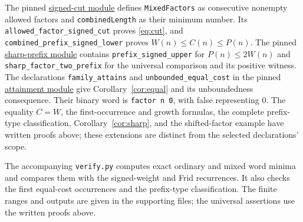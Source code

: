 \documentclass[11pt]{article}
\begin{document}
\begingroup\small
The pinned
\href{https://github.com/the-omega-institute/trureturing/blob/106c79bbb6571a3dc7c60f4b2146860d56e88fc5/D5/S1/Words/Palindromes/ThueMorseSignedCut.lean}{signed-cut module}
defines \texttt{MixedFactors} as consecutive nonempty allowed factors
and \texttt{combinedLength} as their minimum number.
Its \texttt{allowed\_factor\_signed\_cut} proves \eqref{eq:cut}, and
\texttt{combined\_prefix\_signed\_lower} proves $W(n)\leq C(n)\leq P(n)$.
The pinned
\href{https://github.com/the-omega-institute/trureturing/blob/106c79bbb6571a3dc7c60f4b2146860d56e88fc5/D5/S1/Words/Palindromes/ThueMorseSharpPrefix.lean}{sharp-prefix module}
contains \texttt{prefix\_signed\_upper} for $P(n)\leq2W(n)$ and
\texttt{sharp\_factor\_two\_prefix} for the universal comparison
and its positive witness.
The declarations \texttt{family\_attains} and
\texttt{unbounded\_equal\_cost} in
the pinned \href{https://github.com/the-omega-institute/trureturing/blob/106c79bbb6571a3dc7c60f4b2146860d56e88fc5/D5/S1/Words/Palindromes/ThueMorseAttainment.lean}{attainment module}
give Corollary~\ref{cor:equal} and its unboundedness consequence.
Their binary word is \texttt{factor n 0}, with false representing $0$.
The equality $C=W$, the first-occurrence and growth formulas,
the complete prefix-type classification, Corollary~\ref{cor:sharp},
and the shifted-factor example have written proofs above;
these extensions are distinct from the selected declarations' scope.
\par\endgroup

The accompanying \texttt{verify.py} computes exact ordinary and mixed word
minima and compares them with the signed-weight and Frid recurrences.
It also checks the first equal-cost occurrences and the prefix-type
classification. The finite ranges and outputs are given in the supporting
files; the universal assertions use the written proofs above.
\end{document}
